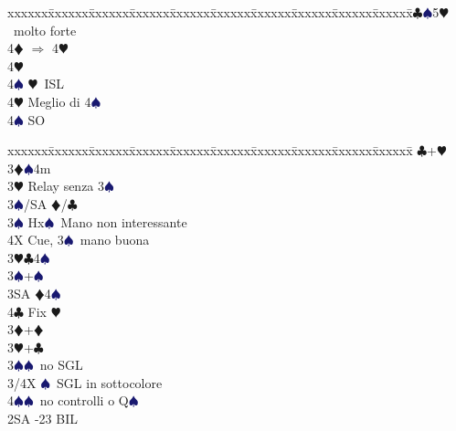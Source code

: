 \documentclass[a4paper,italian]{article}
\newcommand{\BC}{\textcolor{OliveGreen}{$\clubsuit$}}
\newcommand{\BD}{\textcolor{RedOrange}{$\vardiamondsuit$}}
\newcommand{\BH}{\textcolor{Red2}{$\varheartsuit${}}}
\newcommand{\BS}{\textcolor{MidnightBlue}{$\spadesuit${}}}
\newenvironment{bidtable}
{\begin{tabbing}

    xxxxxx\=xxxxxx\=xxxxxx\=xxxxxx\=xxxxxx\=xxxxxx\=xxxxxx\=xxxxxx\=xxxxxx\=xxxxxx\=\kill}
{\end{tabbing} }%
\begin{document}
\begin{multicols}{2}
\begin{bidtable}
                                            4\BC {}\BS 5\BH\ molto forte\+\\
                                            4\BD \> $\Rightarrow$ 4\BH \+\\
                                            4\BH\+\\
                                            4\BS \> \BH\ ISL\-\-\\
                                            4\BH \> Meglio di 4\BS \\
                                            4\BS \> SO\\
                                        \end{bidtable}
                                        \columnbreak
                                        \begin{bidtable}
                                            \BC {}+\BH \+\+\\
                                            3\BD {}\BS 4m\+\\
                                            3\BH \> Relay senza 3\BS\+\\
                                            3\BS/SA \BD/\BC\-\\
                                            3\BS \> Hx\BS\ Mano non interessante\\
                                            4X \> Cue, 3\BS\ mano buona\-\\
                                            3\BH {}\BC 4\BS \\
                                            3\BS {}+\BS \\
                                            3SA \BD 4\BS \\
                                            4\BC \> Fix \BH \-\\
                                            3\BD {}+\BD \\
                                            3\BH {}+\BC \\
                                            3\BS {}\BS\ no SGL\\
                                            3/4X \BS\ SGL in sottocolore\\
                                            4\BS {}\BS\ no controlli o Q\BS \-\\
                                            2SA -23 BIL\\

\end{bidtable}
\end{multicols}
\end{document}
